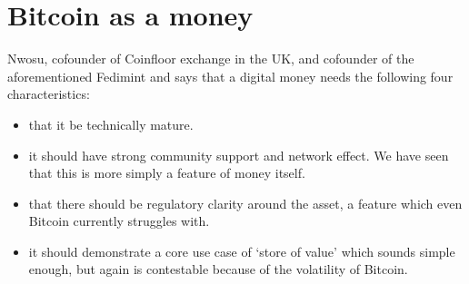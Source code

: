 \section{Bitcoin as a money}
Nwosu, cofounder of Coinfloor exchange in the UK, and cofounder of the aforementioned Fedimint and says that a digital money needs the following four characteristics:
\begin{itemize}
\item that it be technically mature. %
\item it should have strong community support and network effect. We have seen that this is more simply a feature of money itself.
\item that there should be regulatory clarity around the asset, a feature which even Bitcoin currently struggles with.
\item it should demonstrate a core use case of `store of value' which sounds simple enough, but again is contestable because of the volatility of Bitcoin.
\end{itemize}
